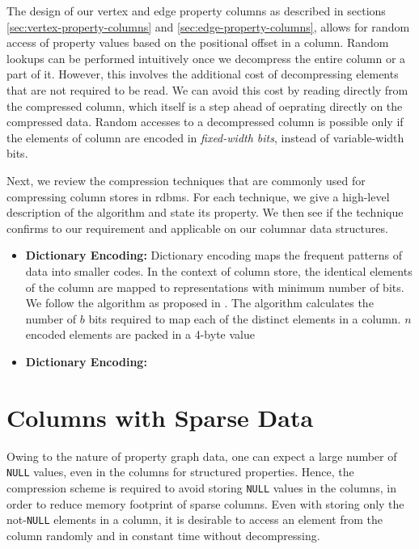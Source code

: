 The design of our vertex and edge property columns as described in sections \ref{sec:vertex-property-columns} and \ref{sec:edge-property-columns}, allows for random access of property values based on the positional offset in a column. Random lookups can be performed intuitively once we decompress the entire column or a part of it. However, this involves the additional cost of decompressing elements that are not required to be read. We can avoid this cost by reading directly from the compressed column, which itself is a step ahead of oeprating directly on the compressed data. Random accesses to a decompressed column is possible only if the elements of column are encoded in \emph{fixed-width bits}, instead of variable-width bits. 

Next, we review the compression techniques that are commonly used for compressing column stores in \gls{rdbms}. For each technique, we give a high-level description of the algorithm and state its property. We then see if the technique confirms to our requirement and applicable on our columnar data structures.

\begin{itemize}
	\item \textbf{Dictionary Encoding: } Dictionary encoding maps the frequent patterns of data into smaller codes. In the context of column store, the identical elements of the column are mapped to representations with minimum number of bits. We follow the algorithm as proposed in \cite{abadi-col-comp}. The algorithm calculates the number of $b$ bits required to map each of the distinct elements in a column. $n$ encoded elements are packed in a 4-byte value 
	
	
	\item \textbf{Dictionary Encoding: }


\end{itemize}


\section{Columns with Sparse Data}
\label{sec:sparse}

Owing to the nature of property graph data, one can expect a large number of \texttt{NULL} values, even in the columns for structured properties. Hence, the compression scheme is required to avoid storing \texttt{NULL} values in the columns, in order to reduce memory footprint of sparse columns. Even with storing only the not-\texttt{NULL} elements in a column, it is desirable to access an element from the column randomly and in constant time without decompressing. 

